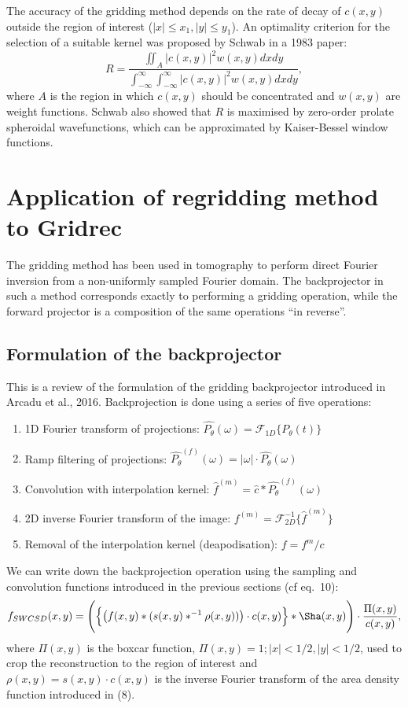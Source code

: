 \documentclass[11pt]{article}
\newcommand\ddfrac[2]{\frac{\displaystyle #1}{\displaystyle #2}}
\begin{document}
The accuracy of the gridding method depends on the rate of decay of $c(x,y)$ outside the region of interest ($|x| \leq x_1, |y| \leq y_1$). An optimality criterion for the selection of a suitable kernel was proposed by Schwab in a 1983 paper:
\begin{equation}
R  = \ddfrac{\iint_A |c(x,y)|^2 w(x,y) dx dy}{\int_{-\infty}^{\infty} \int_{-\infty}^{\infty} |c(x,y)|^2 w(x,y) dx dy},
\end{equation}
where $A$ is the region in which $c(x,y)$ should be concentrated and $w(x,y)$ are weight functions. Schwab also showed that $R$ is maximised by zero-order prolate spheroidal wavefunctions, which can be approximated by Kaiser-Bessel window functions.

\section{Application of regridding method to Gridrec}
The gridding method has been used in tomography to perform direct Fourier inversion from a non-uniformly sampled Fourier domain. The backprojector in such a method corresponds exactly to performing a gridding operation, while the forward projector is a composition of the same operations ``in reverse''.

\subsection{Formulation of the backprojector}
This is a review of the formulation of the gridding backprojector introduced in Arcadu et al., 2016. Backprojection is done using a series of five operations:
\begin{enumerate}
\item 1D Fourier transform of projections: $\hat{P_\theta}(\omega) = \mathcal{F}_{1D}\{P_\theta(t)\}$
\item Ramp filtering of projections: $\hat{P_\theta}^{(f)}(\omega) = |\omega| \cdot \hat{P_\theta}(\omega)$
\item Convolution with interpolation kernel: $\hat{f}^{(m)} = \hat{c} \ast \hat{P_\theta}^{(f)}(\omega)$
\item 2D inverse Fourier transform of the image: $f^{(m)} = \mathcal{F}^{-1}_{2D}\{\hat{f}^{(m)}\}$
\item Removal of the interpolation kernel (deapodisation): $f = f^m/c$
\end{enumerate}

We can write down the backprojection operation using the sampling and convolution functions introduced in the previous sections (cf eq.~10):
\begin{equation}
f_{SWCSD}(x,y) =  \Bigg(\Big\{\big(f(x,y) \ast (s(x,y) \ast^{-1} \rho(x,y))\big) \cdot c(x,y)\Big\} \ast \Sha(x,y)\Bigg) \cdot \frac{\Pi(x,y)}{c(x,y)},
\end{equation}
where $\Pi(x,y)$ is the boxcar function, $\Pi(x,y) = 1; |x|<1/2,|y|<1/2$, used to crop the reconstruction to the region of interest and $\rho(x,y) = s(x,y) \cdot c(x,y)$ is the inverse Fourier transform of the area density function introduced in (8).
\end{document}
